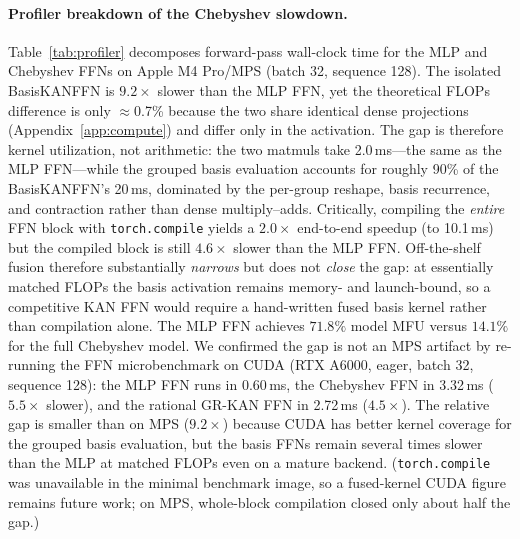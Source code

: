 \documentclass[11pt]{article}
\newcommand{\modelname}[1]{\textsc{#1}}
\newcommand{\grkan}{\modelname{GR-KAN}}
\begin{document}
\paragraph{Profiler breakdown of the Chebyshev slowdown.}
Table~\ref{tab:profiler} decomposes forward-pass wall-clock time for the MLP and Chebyshev FFNs on Apple M4 Pro/MPS (batch 32, sequence 128). The isolated BasisKANFFN is \(9.2\times\) slower than the MLP FFN, yet the theoretical FLOPs difference is only \(\approx\)0.7\% because the two share identical dense projections (Appendix~\ref{app:compute}) and differ only in the activation. The gap is therefore kernel utilization, not arithmetic: the two matmuls take 2.0\,ms---the same as the MLP FFN---while the grouped basis evaluation accounts for roughly 90\% of the BasisKANFFN's 20\,ms, dominated by the per-group reshape, basis recurrence, and contraction rather than dense multiply--adds. Critically, compiling the \emph{entire} FFN block with \texttt{torch.compile} yields a \(2.0\times\) end-to-end speedup (to 10.1\,ms) but the compiled block is still \(4.6\times\) slower than the MLP FFN. Off-the-shelf fusion therefore substantially \emph{narrows} but does not \emph{close} the gap: at essentially matched FLOPs the basis activation remains memory- and launch-bound, so a competitive KAN FFN would require a hand-written fused basis kernel rather than compilation alone. The MLP FFN achieves \(71.8\%\) model MFU versus \(14.1\%\) for the full Chebyshev model. We confirmed the gap is not an MPS artifact by re-running the FFN microbenchmark on CUDA (RTX A6000, eager, batch 32, sequence 128): the MLP FFN runs in 0.60\,ms, the Chebyshev FFN in 3.32\,ms (\(5.5\times\) slower), and the rational \grkan{} FFN in 2.72\,ms (\(4.5\times\)). The relative gap is smaller than on MPS (\(9.2\times\)) because CUDA has better kernel coverage for the grouped basis evaluation, but the basis FFNs remain several times slower than the MLP at matched FLOPs even on a mature backend. (\texttt{torch.compile} was unavailable in the minimal benchmark image, so a fused-kernel CUDA figure remains future work; on MPS, whole-block compilation closed only about half the gap.)
\end{document}

